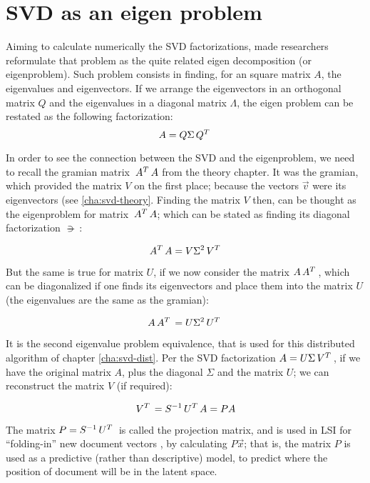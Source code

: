 \section{SVD as an eigen problem}
\label{sec:svd-lanczos-eigen}

Aiming to calculate numerically the SVD factorizations, made
researchers reformulate that problem as the quite related
eigen decomposition (or eigenproblem). Such problem consists in
finding, for an square matrix $A$, the eigenvalues and
eigenvectors. If we arrange the eigenvectors in an orthogonal matrix
$Q$ and the eigenvalues in a diagonal matrix $\Lambda$, the eigen
problem can be restated as the following factorization: \\

\[
A = Q \Sigma \,{Q}^{T}\,
\]
\hfill

In order to see the connection between the SVD and the eigenproblem,
we need to recall the gramian matrix $\,{A}^{T}\,A$ from the theory
chapter. It was the gramian, which provided the matrix $V$ on the
first place; because the vectors 
$\vec{v}$ were its eigenvectors (see \cref{cha:svd-theory}. Finding
the matrix $V$ then, can be thought as the eigenproblem for matrix
$\,{A}^{T}\,A$; which can be stated as finding its diagonal
factorization $\suchthat$: 

\begin{equation}
\label{eq:eigenprob-doc}
\,{A}^{T}\,A = V\Sigma^2\,{V}^{T}\,
\end{equation}
\hfill

But the same is true for matrix $U$, if we now consider the matrix
$A\,{A}^{T}\,$, which can be diagonalized if one finds its eigenvectors
and place them into the matrix $U$ (the eigenvalues are the same as
the gramian): 

\begin{equation}
\label{eq:eigenprob-term}
A\,{A}^{T}\, = U\Sigma^2\,{U}^{T}\,
\end{equation}
\hfill

It is the second eigenvalue problem equivalence, that is used for this
distributed algorithm of chapter \cref{cha:svd-dist}. Per the SVD
factorization $A = U\Sigma\,{V}^{T}\,$, if we have the original matrix
$A$, plus the diagonal $\Sigma$ and the matrix $U$;  we can
reconstruct the matrix $V$ (if required): 

\[
\,{V}^{T}\, = {S}^{-1} \,{U}^{T}\, A = P A
\]
\hfill

The matrix $P = {S}^{-1} \,{U}^{T}\,$ is called the projection matrix, and
is used in LSI for ``folding-in'' new document vectors , by
calculating $P\vec{x}$; that is, the matrix $P$ is used as a
predictive (rather than descriptive) model, to predict where the
position of document  will be in the latent space. \\

